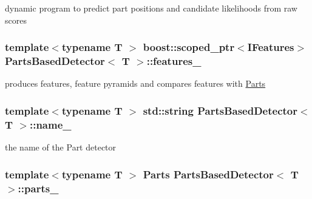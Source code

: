 dynamic program to predict part positions and candidate likelihoods from raw scores 

\hypertarget{classPartsBasedDetector_a6242f9b02fcb1a440cc431f2fc15521f}{
\subsubsection[{features\-\_\-}]{\setlength{\rightskip}{0pt plus 5cm}template$<$typename T $>$ boost\-::scoped\-\_\-ptr$<${\bf \-I\-Features}$>$ {\bf \-Parts\-Based\-Detector}$<$ \-T $>$\-::{\bf features\-\_\-}}}\label{classPartsBasedDetector_a6242f9b02fcb1a440cc431f2fc15521f}


produces features, feature pyramids and compares features with \hyperlink{classParts}{\-Parts} 

\hypertarget{classPartsBasedDetector_a776c766541fb4c2974c6b40a8f4f1c2f}{
\subsubsection[{name\-\_\-}]{\setlength{\rightskip}{0pt plus 5cm}template$<$typename T $>$ std\-::string {\bf \-Parts\-Based\-Detector}$<$ \-T $>$\-::{\bf name\-\_\-}}}\label{classPartsBasedDetector_a776c766541fb4c2974c6b40a8f4f1c2f}


the name of the \-Part detector 

\hypertarget{classPartsBasedDetector_ad548ec9214858535eb6a0f3783d11664}{
\subsubsection[{parts\-\_\-}]{\setlength{\rightskip}{0pt plus 5cm}template$<$typename T $>$ {\bf \-Parts} {\bf \-Parts\-Based\-Detector}$<$ \-T $>$\-::{\bf parts\-\_\-}}}\label{classPartsBasedDetector_ad548ec9214858535eb6a0f3783d11664}


